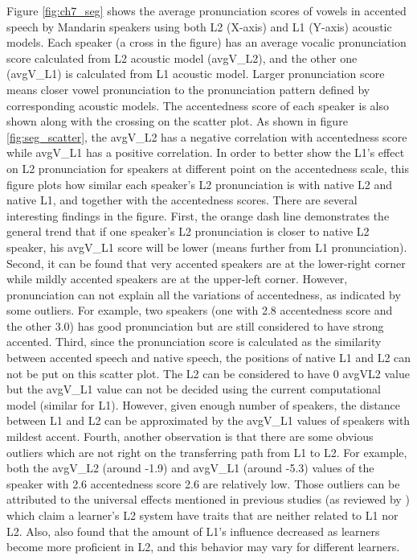 Figure \ref{fig:ch7_seg} shows the average pronunciation scores of vowels in accented speech by Mandarin speakers using both L2 (X-axis) and L1 (Y-axis) acoustic models. Each speaker (a cross in the figure) has an average vocalic pronunciation score calculated from L2 acoustic model (avgV\_L2), and the other one (avgV\_L1) is calculated from L1 acoustic model. Larger pronunciation score means closer vowel pronunciation to the pronunciation pattern defined by corresponding acoustic models. The accentedness score of each speaker is also shown along with the crossing on the scatter plot. As shown in figure \ref{fig:seg_scatter}, the avgV\_L2 has a negative correlation with accentedness score while avgV\_L1 has a positive correlation. In order to better show the L1's effect on L2 pronunciation for speakers at different point on the accentedness scale, this figure plots how similar each speaker's L2 pronunciation is with native L2 and native L1, and together with the accentedness scores. There are several interesting findings in the figure. First, the orange dash line demonstrates the general trend that if one speaker's L2 pronunciation is closer to native L2 speaker, his avgV\_L1 score will be lower (means further from L1 pronunciation). Second, it can be found that very accented speakers are at the lower-right corner while mildly accented speakers are at the upper-left corner. However, pronunciation can not explain all the variations of accentedness, as indicated by some outliers. For example, two speakers (one with 2.8 accentedness score and the other 3.0) has good pronunciation but are still considered to have strong accented. Third, since the pronunciation score is calculated as the similarity between accented speech and native speech, the positions of native L1 and L2 can not be put on this scatter plot. The L2 can be considered to have 0 avgV\-L2 value but the avgV\_L1 value can not be decided using the current computational model (similar for L1). However, given enough number of speakers, the distance between L1 and L2 can be approximated by the avgV\_L1 values of speakers with mildest accent. Fourth, another observation is that there are some obvious outliers which are not right on the transferring path from L1 to L2. For example, both the avgV\_L2 (around -1.9) and avgV\_L1 (around -5.3) values of the speaker with 2.6 accentedness score 2.6 are relatively low. Those outliers can be attributed to the universal effects mentioned in previous studies (as reviewed by \cite{white1989universal}) which claim a learner's L2 system have traits that are neither related to L1 nor L2. Also, \cite{major1987model} also found that the amount of L1's influence decreased as learners become more proficient in L2, and this behavior may vary for different learners.

